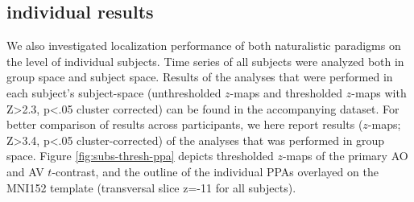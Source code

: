 \documentclass[english]{article}
\begin{document}
\subsection{individual results}



We also investigated localization performance of both naturalistic paradigms on
the level of individual subjects.
Time series of all subjects were analyzed both in group space and subject space.
Results of the analyses that were performed in each subject's subject-space
(unthresholded $z$-maps and thresholded $z$-maps with Z>2.3, p<.05 cluster
corrected) can be found in the accompanying dataset.
For better comparison of results across participants, we here report results
($z$-maps; Z>3.4, p<.05 cluster-corrected) of the analyses that was performed in
group space.
Figure \ref{fig:subs-thresh-ppa} depicts thresholded $z$-maps of the primary AO
and AV $t$-contrast, and the outline of the individual PPAs
\citep{sengupta2016extension} overlayed on the MNI152 template (transversal slice z=-11 for all subjects).

\end{document}
